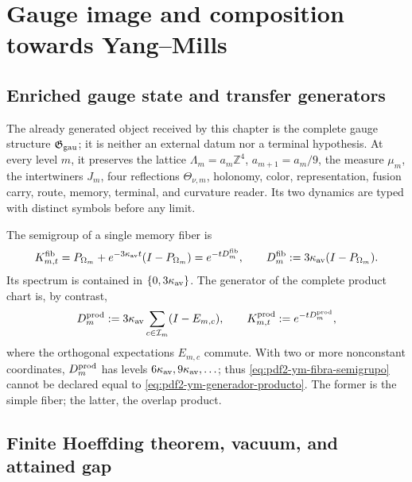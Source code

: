 \section{Gauge image and composition towards Yang--Mills}

\subsection{Enriched gauge state and transfer generators}

The already generated object received by this chapter is the complete gauge structure
$\mathfrak G_{\rm gau}$; it is neither an external datum nor a terminal hypothesis.
At every level $m$, it preserves the lattice
$\Lambda_m=a_m\mathbb Z^4$, $a_{m+1}=a_m/9$, the measure $\mu_m$, the
intertwiners $J_m$, four reflections $\Theta_{\nu,m}$, holonomy, color,
representation, fusion carry, route, memory, terminal, and curvature reader.
Its two dynamics are typed with distinct symbols before any limit.

The semigroup of a single memory fiber is
\begin{equation}\label{eq:pdf2-ym-fibra-semigrupo}
 K^{\rm fib}_{m,t}
 =P_{\Omega_m}+e^{-3\kappa_{\rm av}t}(I-P_{\Omega_m})
 =e^{-tD_m^{\rm fib}},
 \qquad
 D_m^{\rm fib}:=3\kappa_{\rm av}(I-P_{\Omega_m}).
\end{equation}
Its spectrum is contained in $\{0,3\kappa_{\rm av}\}$. The generator of the
complete product chart is, by contrast,
\begin{equation}\label{eq:pdf2-ym-generador-producto}
 D_m^{\rm prod}:=3\kappa_{\rm av}
 \sum_{c\in\mathcal I_m}(I-E_{m,c}),
 \qquad
 K^{\rm prod}_{m,t}:=e^{-tD_m^{\rm prod}},
\end{equation}
where the orthogonal expectations $E_{m,c}$ commute. With two or more
nonconstant coordinates, $D_m^{\rm prod}$ has levels
$6\kappa_{\rm av},9\kappa_{\rm av},\ldots$; thus
\eqref{eq:pdf2-ym-fibra-semigrupo} cannot be declared equal to
\eqref{eq:pdf2-ym-generador-producto}. The former is the simple fiber; the latter,
the overlap product.

\subsection{Finite Hoeffding theorem, vacuum, and attained gap}

